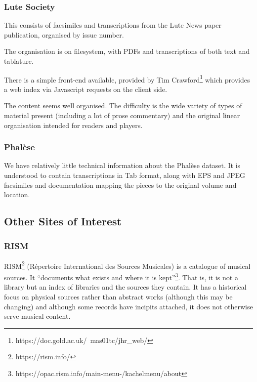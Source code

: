 \documentclass[sigconf, nonacm=true]{acmart}
\begin{document}
\begin{sloppypar}
  \subsubsection{Lute Society}

  This consists of facsimiles and transcriptions from the Lute News
  paper publication, organised by issue number.
  
  The organisation is on filesystem, with PDFs and transcriptions of
  both text and tablature.
  
  There is a simple front-end available, provided by Tim
  Crawford\footnote{https://doc.gold.ac.uk/~mas01tc/jhr\_web/} which
  provides a web index via Javascript requests on the client side.
  
  The content seems well organised. The difficulty is the wide variety
  of types of material present (including a lot of prose commentary)
  and the original linear organisation intended for readers and players.
  
  \subsubsection{Phal\`ese}

  We have relatively little technical information about the Phal\`ese
  dataset. It is understood to contain transcriptions in Tab format,
  along with EPS and JPEG facsimiles and documentation mapping the
  pieces to the original volume and location.

  \subsection{Other Sites of Interest}\label{other-sites}
  
  \subsubsection{RISM}

  RISM\footnote{https://rism.info/} (R\'epertoire International des
  Sources Musicales) is a catalogue of musical sources. It ``documents
  what exists and where it is
  kept''\footnote{https://opac.rism.info/main-menu-/kachelmenu/about}. That
  is, it is not a library but an index of libraries and the sources
  they contain. It has a historical focus on physical sources rather
  than abstract works (although this may be changing) and although
  some records have incipits attached, it does not otherwise serve
  musical content.


\end{sloppypar}
\end{document}
